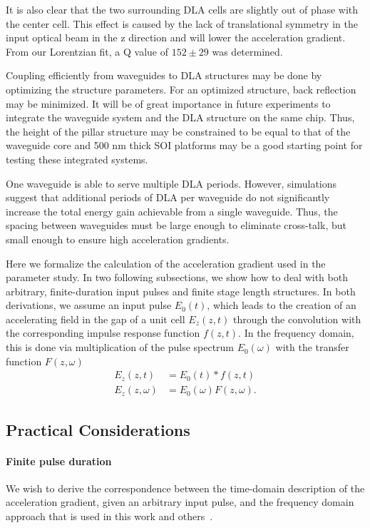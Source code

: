 It is also clear that the two surrounding DLA cells are slightly out of phase with the center cell.
This effect is caused by the lack of translational symmetry in the input optical beam in the z direction and will lower the acceleration gradient.
From our Lorentzian fit, a Q value of $152 \pm 29$ was determined.

Coupling efficiently from waveguides to DLA structures may be done by optimizing the structure parameters.
For an optimized structure, back reflection may be minimized.
It will be of great importance in future experiments to integrate the waveguide system and the DLA structure on the same chip.
Thus, the height of the pillar structure may be constrained to be equal to that of the waveguide core and 500 nm thick SOI platforms may be a good starting point for testing these integrated systems.

One waveguide is able to serve multiple DLA periods.
However, simulations suggest that additional periods of DLA per waveguide do not significantly increase the total energy gain achievable from a single waveguide.
Thus, the spacing between waveguides must be large enough to eliminate cross-talk, but small enough to ensure high acceleration gradients.

Here we formalize the calculation of the acceleration gradient used in the parameter study.  In two following subsections, we show how to deal with both arbitrary, finite-duration input pulses and finite stage length structures.  In both derivations, we assume an input pulse $E_0(t)$, which leads to the creation of an accelerating field in the gap of a unit cell $E_z(z,t)$ through the convolution with the corresponding impulse response function $f(z,t)$. In the frequency domain, this is done via multiplication of the pulse spectrum $E_0(\omega)$ with the transfer function $F(z,\omega)$
\begin{align}
 E_z(z,t) &= E_0(t) \ast f(z,t)\\
 E_z(z,\omega) &= E_0(\omega) F(z,\omega).
\end{align}

\subsection{Practical Considerations}

\paragraph{Finite pulse duration}
We wish to derive the correspondence between the time-domain description of the acceleration gradient, given an arbitrary input pulse, and the frequency domain approach that is used in this work and others~\cite{hughes_method_2017, plettner2006proposed}. 

